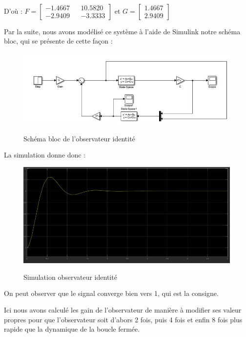 \paragraph{} D'où : $ F = \begin{bmatrix} -1.4667 && 10.5820 \\ -2.9409 && -3.3333 \end{bmatrix} $ et $ G = \begin{bmatrix}1.4667 \\ 2.9409\end{bmatrix} $\\
\par Par la suite, nous avons modélisé ce système à l'aide de Simulink notre schéma bloc, qui se présente de cette façon :
\begin{figure}[h!]
\centering
\includegraphics[scale = 0.7]{SIM1.JPG}\\[0.7 cm] 
\caption{Schéma bloc de l'observateur identité}
\end{figure}
\par La simulation donne donc :
\begin{figure}[h!]
\centering
\includegraphics[scale = 0.7]{T1.JPG}\\[0.7 cm] 
\caption{Simulation observateur identité}
\end{figure}
\par On peut observer que le signal converge bien vers 1, qui est la consigne.
\par Ici nous avons calculé les gain de l'observateur de manière à modifier ses valeur propres pour que l'observateur soit d'abors 2 fois, puis 4 fois et enfin 8 fois plus rapide que la dynamique de la boucle fermée.
